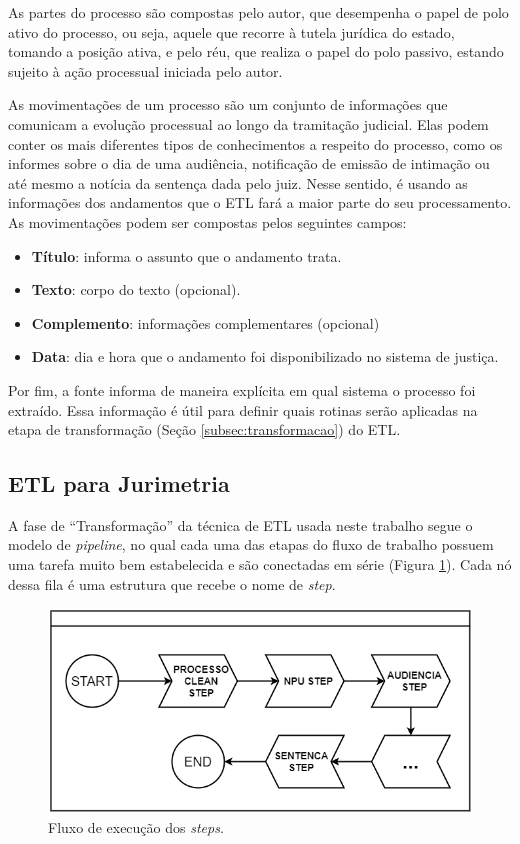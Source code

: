 As partes do processo são compostas pelo autor, que desempenha o papel de polo ativo do processo, ou seja, aquele que recorre à tutela jurídica do estado, tomando a posição ativa, e pelo réu, que realiza o papel do polo passivo, estando sujeito à ação processual iniciada pelo autor.

As movimentações de um processo são um conjunto de informações que comunicam a evolução processual ao longo da tramitação judicial. Elas podem conter os mais diferentes tipos de conhecimentos a respeito do processo, como os informes sobre o dia de uma audiência, notificação de emissão de intimação ou até mesmo a notícia da sentença dada pelo juiz. Nesse sentido, é usando as informações dos andamentos que o ETL fará a maior parte do seu processamento. As movimentações podem ser compostas pelos seguintes campos: 

\begin{itemize}
    \item \textbf{Título}: informa o assunto que o andamento trata.
    \item \textbf{Texto}: corpo do texto (opcional).
    \item \textbf{Complemento}: informações complementares (opcional)
    \item \textbf{Data}: dia e hora que o andamento foi disponibilizado no sistema de justiça.
\end{itemize}

Por fim, a fonte informa de maneira explícita em qual sistema o processo foi extraído. Essa informação é útil para definir quais rotinas serão aplicadas na etapa de transformação (Seção \ref{subsec:transformacao}) do ETL.


\subsection{ETL para Jurimetria}
\label{subsec:jurimetria}

A fase de \enquote{Transformação} da técnica de ETL usada neste trabalho segue o modelo de \textit{pipeline}, no qual cada uma das etapas do fluxo de trabalho possuem uma tarefa muito bem estabelecida e são conectadas em série (Figura \ref{fig:stepsFlow}). Cada nó dessa fila é uma estrutura que recebe o nome de \textit{step}.

\begin{figure}[ht]
\centering
\includegraphics[width=1\textwidth]{imagens/steps-flow.png}
\caption{Fluxo de execução dos \textit{steps}.}
\label{fig:stepsFlow}
\end{figure}

